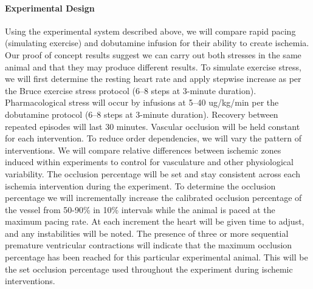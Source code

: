 \paragraph{Experimental Design} Using the experimental system described above, we will compare rapid pacing (simulating exercise) and dobutamine infusion for their ability to create ischemia. Our proof of concept results suggest we can carry out both stresses in the same animal and that they may produce different results.  To simulate exercise stress, we will first determine the resting heart rate and apply stepwise increase as per the Bruce exercise stress protocol (6--8 steps at 3-minute duration).\cite{BLZ:Oki1986} Pharmacological stress will occur by infusions at 5--40 ug/kg/min per the dobutamine protocol (6--8 steps at 3-minute duration).\cite{BLZ:SAL1992} Recovery between repeated episodes will last 30 minutes. Vascular occlusion will be held constant for each intervention. To reduce order dependencies, we will vary the pattern of interventions. We will compare relative differences between ischemic zones induced within experiments to control for vasculature and other physiological variability. The occlusion percentage will be set and stay consistent across each ischemia intervention during the experiment. To determine the occlusion percentage we will incrementally increase the calibrated occlusion percentage of the vessel from 50-90\% in 10\% intervals while the animal is paced at the maximum pacing rate. At each increment the heart will be given time to adjust, and any instabilities will be noted. The presence of three or more sequential premature ventricular contractions will indicate that the maximum occlusion percentage has been reached for this particular experimental animal. This will be the set occlusion percentage used throughout the experiment during ischemic interventions. 

